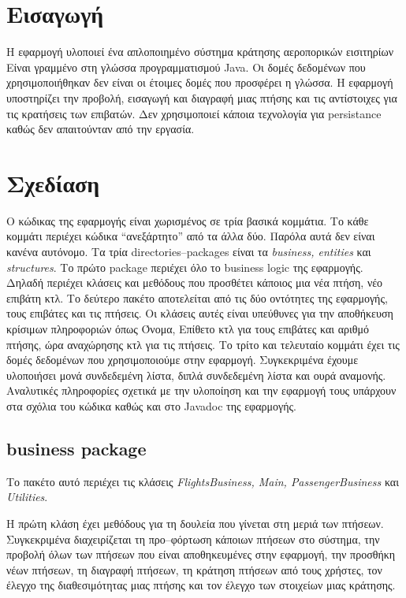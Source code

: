 \documentclass[a4paper]{article}
\begin{document}

\tableofcontents
\newpage
\section{Εισαγωγή}
Η εφαρμογή υλοποιεί ένα απλοποιημένο σύστημα κράτησης αεροπορικών εισιτηρίων
Είναι γραμμένο στη γλώσσα προγραμματισμού Java. Οι δομές δεδομένων που
χρησιμοποιήθηκαν δεν είναι οι έτοιμες δομές που προσφέρει η γλώσσα. Η εφαρμογή
υποστηρίζει την προβολή, εισαγωγή και διαγραφή μιας πτήσης και τις αντίστοιχες
για τις κρατήσεις των επιβατών. Δεν χρησιμοποιεί κάποια τεχνολογία για
persistance καθώς δεν απαιτούνταν από την εργασία.

\section{Σχεδίαση}
Ο κώδικας της εφαρμογής είναι χωρισμένος σε τρία βασικά κομμάτια. Το κάθε
κομμάτι περιέχει κώδικα ``ανεξάρτητο'' από τα άλλα δύο. Παρόλα αυτά δεν είναι
κανένα αυτόνομο. Τα τρία directories--packages είναι τα \emph{business,
entities} και \emph{structures}. Το πρώτο package περιέχει όλο το business logic
της εφαρμογής. Δηλαδή περιέχει κλάσεις και μεθόδους που προσθέτει κάποιος μια
νέα πτήση, νέο επιβάτη κτλ. Το δεύτερο πακέτο αποτελείται από τις δύο οντότητες
της εφαρμογής, τους επιβάτες και τις πτήσεις. Οι κλάσεις αυτές είναι υπεύθυνες
για την αποθήκευση κρίσιμων πληροφοριών όπως Όνομα, Επίθετο κτλ για τους
επιβάτες και αριθμό πτήσης, ώρα αναχώρησης κτλ για τις πτήσεις. Το τρίτο και
τελευταίο κομμάτι έχει τις δομές δεδομένων που χρησιμοποιούμε στην εφαρμογή.
Συγκεκριμένα έχουμε υλοποιήσει μονά συνδεδεμένη λίστα, διπλά συνδεδεμένη λίστα
και ουρά αναμονής. Αναλυτικές πληροφορίες σχετικά με την υλοποίηση και την
εφαρμογή τους υπάρχουν στα σχόλια του κώδικα καθώς και στο Javadoc της
εφαρμογής.

\subsection{business package}
Το πακέτο αυτό περιέχει τις κλάσεις \emph{FlightsBusiness, Main,
PassengerBusiness} και \emph{Utilities}.

Η πρώτη κλάση έχει μεθόδους για τη δουλεία που γίνεται στη μεριά των πτήσεων.
Συγκεκριμένα διαχειρίζεται τη προ--φόρτωση κάποιων πτήσεων στο σύστημα, την
προβολή όλων των πτήσεων που είναι αποθηκευμένες στην εφαρμογή, την προσθήκη
νέων πτήσεων, τη διαγραφή πτήσεων, τη κράτηση πτήσεων από τους χρήστες, τον
έλεγχο της διαθεσιμότητας μιας πτήσης και τον έλεγχο των στοιχείων μιας
κράτησης.
\end{document}
